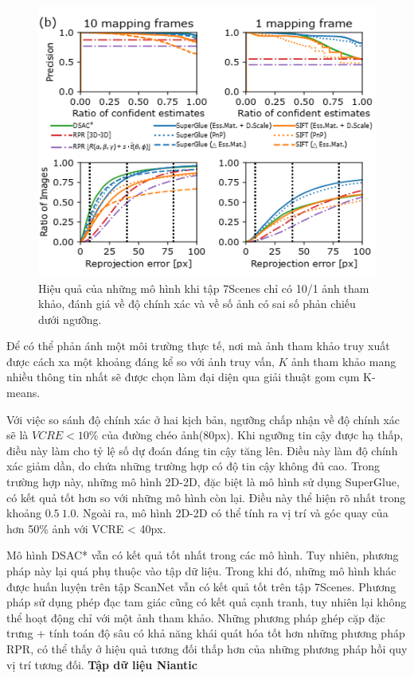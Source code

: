 \begin{figure}[H]
  \centering
  \includegraphics[scale=0.8]{pics/Proposal/partial_7scene.png}
  \caption[Hiệu quả của các mô hình khi giới hạn ảnh tham khảo]{Hiệu quả của những mô hình khi tập 7Scenes chỉ có 10/1 ảnh tham khảo, đánh giá về độ chính xác và về số ảnh có sai số phản chiếu dưới ngưỡng.}
\end{figure}

Để có thể phản ánh một môi trường thực tế, nơi mà ảnh tham khảo truy xuất được cách xa một khoảng đáng kể so với ảnh truy vấn, $K$ ảnh tham khảo mang nhiều thông tin nhất sẽ được chọn làm đại diện qua giải thuật gom cụm K-means.

Với việc so sánh độ chính xác ở hai kịch bản, ngưỡng chấp nhận về độ chính xác sẽ là $VCRE<10\%$ của đường chéo ảnh(80px). Khi ngưỡng tin cậy được hạ thấp, điều này làm cho tỷ lệ số dự đoán đáng tin cậy tăng lên. Điều này làm độ chính xác giảm dần, do chứa những trường hợp có độ tin cậy không đủ cao. Trong trường hợp này, những mô hình 2D-2D, đặc biệt là mô hình sử dụng SuperGlue, có kết quả tốt hơn so với những mô hình còn lại. Điều này thể hiện rõ nhất trong khoảng $0.5~1.0$. Ngoài ra, mô hình 2D-2D có thể tính ra vị trí và góc quay của hơn 50\% ảnh với VCRE < 40px.

Mô hình DSAC* vẫn có kết quả tốt nhất trong các mô hình. Tuy nhiên, phương pháp này lại quá phụ thuộc vào tập dữ liệu. Trong khi đó, những mô hình khác được huấn luyện trên tập ScanNet vẫn có kết quả tốt trên tập 7Scenes. Phương pháp sử dụng phép đạc tam giác cũng có kết quả cạnh tranh, tuy nhiên lại không thể hoạt động chỉ với một ảnh tham khảo. Những phương pháp ghép cặp đặc trưng + tính toán độ sâu có khả năng khái quát hóa tốt hơn những phương pháp RPR, có thể thấy ở hiệu quả tương đối thấp hơn của những phương pháp hồi quy vị trí tương đối.
\newpage
\textbf{Tập dữ liệu Niantic \cite{arnold2022mapfree}}

